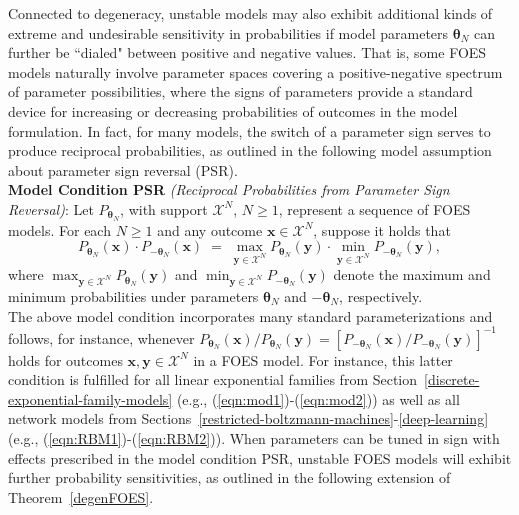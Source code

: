 \documentclass[12pt]{article}
\theoremstyle{definition}
\begin{document}
Connected to degeneracy, unstable models may also exhibit additional kinds of  extreme and undesirable sensitivity in probabilities if model parameters $\boldsymbol \theta_N$ can further be ``dialed"  between positive and negative values.  That is, some FOES  models naturally involve parameter spaces covering a positive-negative spectrum of parameter possibilities, where the signs of parameters provide a standard device for increasing or decreasing probabilities of outcomes in the model formulation.  In fact, for many models, the switch of a parameter sign serves to produce reciprocal probabilities, as outlined in the following model assumption about parameter sign reversal (PSR).\\

\noindent \textbf{Model Condition PSR} {\it (Reciprocal Probabilities from Parameter Sign Reversal)}: Let $P_{\boldsymbol \theta_N}$, with support $\mathcal{X}^N$, $N\geq 1$, represent a sequence of FOES models.  For each $N \geq 1$ and any outcome
$\boldsymbol x \in \mathcal{X}^N$, suppose it holds that
\[
  P_{\boldsymbol \theta_N}(\boldsymbol x)  \cdot P_{-\boldsymbol \theta_N}(\boldsymbol x) \;=\;   \max\limits_{\boldsymbol y \in \mathcal{X}^N}P_{ \boldsymbol \theta_N}(\boldsymbol y)\cdot \min\limits_{\boldsymbol y \in \mathcal{X}^N}P_{-\boldsymbol \theta_N}(\boldsymbol y),
\]
where $\max_{\boldsymbol y \in \mathcal{X}^N}P_{ \boldsymbol \theta_N}(\boldsymbol y)$ and $\min_{\boldsymbol y \in \mathcal{X}^N}P_{-\boldsymbol \theta_N}(\boldsymbol y)$ denote the   maximum and minimum probabilities under parameters $\boldsymbol \theta_N$   and
 $-\boldsymbol \theta_N$, respectively.\\

 The above model condition incorporates many standard parameterizations and follows, for instance, whenever $ P_{\boldsymbol \theta_N}(\boldsymbol x)/P_{\boldsymbol \theta_N}(\boldsymbol y)  = [P_{-\boldsymbol \theta_N}(\boldsymbol x)/P_{-\boldsymbol \theta_N}(\boldsymbol y)]^{-1}$ holds for outcomes $\boldsymbol x,\boldsymbol y\in\mathcal{X}^N$ in a FOES model.  For instance, this latter condition is fulfilled for all
 linear exponential families from Section~\ref{discrete-exponential-family-models} (e.g., (\ref{eqn:mod1})-(\ref{eqn:mod2})) as well as all network models from Sections~\ref{restricted-boltzmann-machines}-\ref{deep-learning} (e.g., (\ref{eqn:RBM1})-(\ref{eqn:RBM2})).  When parameters can be tuned in sign with effects prescribed in the model condition PSR, unstable FOES models will exhibit further probability sensitivities, as outlined in the
 following extension of Theorem~\ref{degenFOES}.
\end{document}
